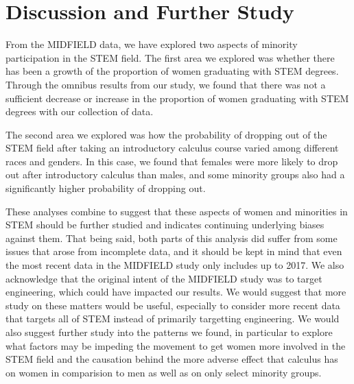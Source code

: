\documentclass[]{article}
\begin{document}
\section{Discussion and Further
Study}\label{discussion-and-further-study}

From the MIDFIELD data, we have explored two aspects of minority
participation in the STEM field. The first area we explored was whether
there has been a growth of the proportion of women graduating with STEM
degrees. Through the omnibus results from our study, we found that there
was not a sufficient decrease or increase in the proportion of women
graduating with STEM degrees with our collection of data.

The second area we explored was how the probability of dropping out of
the STEM field after taking an introductory calculus course varied among
different races and genders. In this case, we found that females were
more likely to drop out after introductory calculus than males, and some
minority groups also had a significantly higher probability of dropping
out.

These analyses combine to suggest that these aspects of women and
minorities in STEM should be further studied and indicates continuing
underlying biases against them. That being said, both parts of this
analysis did suffer from some issues that arose from incomplete data,
and it should be kept in mind that even the most recent data in the
MIDFIELD study only includes up to 2017. We also acknowledge that the
original intent of the MIDFIELD study was to target engineering, which
could have impacted our results. We would suggest that more study on
these matters would be useful, especially to consider more recent data
that targets all of STEM instead of primarily targetting engineering. We
would also suggest further study into the patterns we found, in
particular to explore what factors may be impeding the movement to get
women more involved in the STEM field and the causation behind the more
adverse effect that calculus has on women in comparision to men as well
as on only select minority groups.

\newpage
\end{document}
